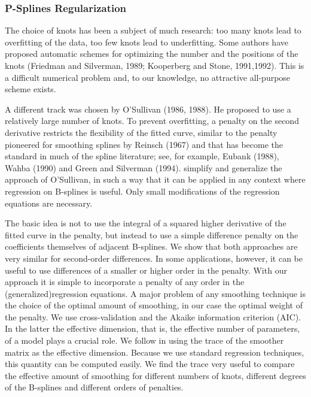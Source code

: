 \documentclass[12pt]{article}
\newcommand*\needsparaphrased{\color{red}}
\newcommand*\outlineskeleton{\color{green}}
\begin{document}
{\subsubsection{{\outlineskeleton P-Splines Regularization}}

{ \needsparaphrased The choice of knots has been a subject of much research: too many knots lead to overfitting of the data, too few knots lead to underfitting. Some authors have proposed automatic schemes for optimizing the number and the positions of the knots (Friedman and Silverman, 1989; Kooperberg and Stone, 1991,1992). This is a difficult numerical problem and, to our knowledge, no attractive all-purpose scheme exists.}

{ \needsparaphrased A different track was chosen by O'Sullivan (1986, 1988). He proposed to use a relatively large number of knots. To prevent overfitting, a penalty on the second derivative restricts the flexibility of the fitted curve, similar to the penalty pioneered for smoothing splines by Reinsch (1967) and that has become the standard in much of the spline literature; see, for example, Eubank (1988), Wahba (1990) and Green and Silverman (1994). \cite{eilers1996flexible} simplify and generalize the approach of O'Sullivan, in such a way that it can be applied in any context where regression on B-splines is useful. Only small modifications of the regression equations are necessary.

The basic idea is not to use the integral of a squared higher derivative of the fitted curve in the penalty, but instead to use a simple difference penalty on the coefficients themselves of adjacent B-splines. We show that both approaches are very similar for second-order differences. In some applications, however, it can be useful to use differences of a smaller or higher order in the penalty. With our approach it is simple to incorporate a penalty of any order in the (generalized)regression equations. A major problem of any smoothing technique is the choice of the optimal amount of smoothing, in our case the optimal weight of the penalty. We use cross-validation and the Akaike information criterion (AIC). In the latter the effective dimension, that is, the effective number of parameters, of a model plays a crucial role. We follow \cite{buja1989linear} in using the trace of the smoother matrix as the effective dimension. Because we use standard regression techniques, this quantity can be computed easily. We find the trace very useful to compare the effective amount of smoothing for different numbers of knots, different degrees of the B-splines and different orders of penalties.}

}
\end{document}
